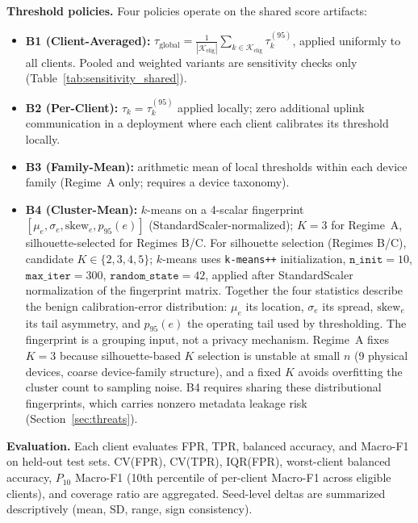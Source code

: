 \textbf{Threshold policies.}
Four policies operate on the shared score artifacts:
\begin{itemize}
  \item \textbf{B1 (Client-Averaged):}
        $\tau_{\text{global}} = \frac{1}{|\mathcal{K}_{\mathrm{elig}}|}\sum_{k\in\mathcal{K}_{\mathrm{elig}}} \tau_k^{(95)}$,
        applied uniformly to all clients.
        Pooled and weighted variants are sensitivity checks only
        (Table~\ref{tab:sensitivity_shared}).

  \item \textbf{B2 (Per-Client):} $\tau_k = \tau_k^{(95)}$ applied locally;
        zero additional uplink communication in a deployment where each client
        calibrates its threshold locally.

  \item \textbf{B3 (Family-Mean):} arithmetic mean of local thresholds within each device
        family (Regime~A only; requires a device taxonomy).

  \item \textbf{B4 (Cluster-Mean):} $k$-means on a 4-scalar fingerprint
        $[\mu_e, \sigma_e, \text{skew}_e, p_{95}(e)]$ (StandardScaler-normalized);
        $K{=}3$ for Regime~A, silhouette-selected for Regimes B/C.
        For silhouette selection (Regimes B/C), candidate $K \in \{2,3,4,5\}$;
        $k$-means uses \texttt{k-means++} initialization, $\texttt{n\_init}{=}10$,
        $\texttt{max\_iter}{=}300$, $\texttt{random\_state}{=}42$, applied after
        StandardScaler normalization of the fingerprint matrix.
        Together the four statistics describe the benign calibration-error
        distribution: $\mu_e$ its location, $\sigma_e$ its spread, $\text{skew}_e$
        its tail asymmetry, and $p_{95}(e)$ the operating tail used by thresholding.
        The fingerprint is a grouping input, not a privacy mechanism.
        Regime~A fixes $K{=}3$ because silhouette-based $K$ selection is unstable
        at small $n$ (9 physical devices, coarse device-family structure), and a
        fixed $K$ avoids overfitting the cluster count to sampling noise.
        B4 requires sharing these distributional fingerprints, which carries nonzero
        metadata leakage risk (Section~\ref{sec:threats}).
\end{itemize}

\textbf{Evaluation.}
Each client evaluates FPR, TPR, balanced accuracy, and Macro-F1 on held-out test sets.
CV(FPR), CV(TPR), IQR(FPR), worst-client balanced accuracy, $P_{10}$ Macro-F1 (10th percentile
of per-client Macro-F1 across eligible clients), and coverage ratio are aggregated.
Seed-level deltas are summarized descriptively (mean, SD, range, sign consistency).
